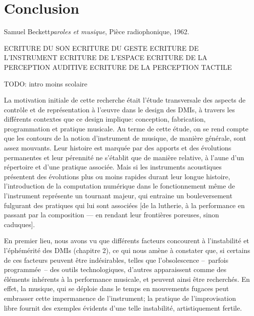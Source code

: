 %
\chapter{Conclusion}
\label{ch:conclusion}

{Samuel Beckett}{\textit{paroles et musique}, Pièce radiophonique, 1962. \cite{beckett_comeet_2014}}

ECRITURE DU SON
ECRITURE DU GESTE
ECRITURE DE L'INSTRUMENT
ECRITURE DE L'ESPACE
ECRITURE DE LA PERCEPTION AUDITIVE
ECRITURE DE LA PERCEPTION TACTILE

TODO: intro moins scolaire

\noindent La motivation initiale de cette recherche était l'étude transversale des aspects de contrôle et de représentation à l'œuvre dans le design des \glspl{DMI}, à travers les différents contextes que ce design implique: conception, fabrication, programmation et pratique musicale. Au terme de cette étude, on se rend compte que les contours de la notion d'instrument de musique, de manière générale, sont assez mouvants. Leur histoire est marquée par des apports et des évolutions permanentes et leur pérennité ne s'établit que de manière relative, à l'aune d'un répertoire et d'une pratique associée. Mais si les instruments acoustiques présentent des évolutions plus ou moins rapides durant leur longue histoire, l'introduction de la computation numérique dans le fonctionnement même de l'instrument représente un tournant majeur, qui entraine un bouleversement fulgurant des pratiques qui lui sont associées [de la lutherie, à la performance en passant par la composition — en rendant leur frontières poreuses, sinon caduques].

\noindent En premier lieu, nous avons vu que différents facteurs concourent à l'instabilité et l'éphémérité des \glspl{DMI} (chapitre 2), ce qui nous amène à constater que, si certains de ces facteurs peuvent être indésirables, telles que l'obsolescence --~parfois programmée~-- des outils technologiques, d'autres apparaissent comme des éléments inhérents à la performance musicale, et peuvent ainsi être recherchés. En effet, la musique, qui se déploie dans le temps en mouvements fugaces peut embrasser cette impermanence de l'instrument; la pratique de l'improvisation libre fournit des exemples évidents d'une telle instabilité, artistiquement fertile.



